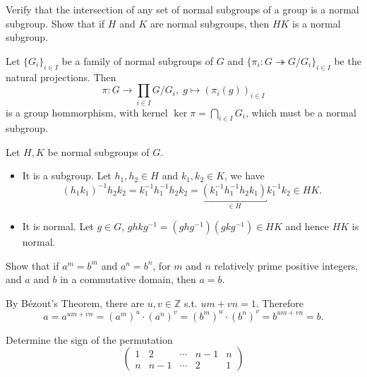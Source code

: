 \begin{problem}
    Verify that the intersection of any set of normal subgroups of a group is a normal subgroup. 
    Show that if $H$ and $K$ are normal subgroups, then $HK$ is a normal subgroup.
\end{problem}


\begin{solution}
    Let $\{G_{i}\}_{i\in I}$ be a family of normal subgroups of $G$ and $\{\pi_{i}\colon G\twoheadrightarrow G/G_{i}\}_{i\in I}$ 
    be the natural projections. Then 
        \[
            \pi\colon G \to \prod_{i\in I}G/G_{i},\; g\mapsto (\pi_{i}(g))_{i\in I}
        \]
    is a group hommorphism, with kernel $\ker\pi=\bigcap_{i\in I}G_{i}$, which must be a normal subgroup.
\par Let $H,K$ be normal subgroups of $G$. 
    \begin{itemize}
        \item It is a subgroup. Let $h_{1},h_{2}\in H$ and $k_{1},k_{2}\in K$, we have
            \[
                (h_{1}k_{1})^{-1}h_{2}k_{2}=k_{1}^{-1}h_{1}^{-1}h_{2}k_{2}=\underbracket{(k_{1}^{-1}h_{1}^{-1}h_{2}k_{1})}_{\in H}k_{1}^{-1}k_{2}\in H K.
            \]
        \item It is normal. Let $g\in G$, $g h k g^{-1}=(g h g^{-1}) (g k g^{-1})\in H K$ and hence $H K$ is normal.
    \end{itemize}
\end{solution}

\setcounter{pb}{15}
\begin{problem}
    Show that if $ a^m = b^m $ and $ a^n = b^n $, for $ m $ and $ n $ relatively prime positive integers, and $ a $ and $ b $ in a commutative domain, then $ a = b $.
\end{problem}

\begin{solution}
    By B\'ezout's Theorem, there are $ u,v\in\mathbb{Z}$ s.t. $u m+v n=1$. Therefore
        \[
            a=a^{u m+v n}=(a^{m})^{u}\cdot(a^{n})^{v}=(b^{m})^{u}\cdot(b^{n})^{v}=b^{u m+v n}=b.
        \]
\end{solution}

\setcounter{pb}{16}
\begin{problem}
    Determine the sign of the permutation   
    \[
    \begin{pmatrix}
    1 & 2 & \cdots & n-1 & n \\
    n & n-1 & \cdots & 2 & 1
    \end{pmatrix}
    \]
\end{problem}

